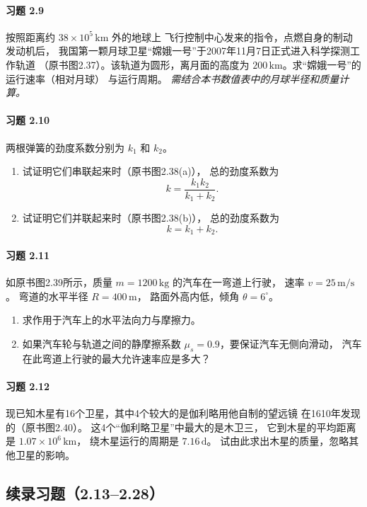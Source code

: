 \paragraph{习题 2.9}
按照距离约 \(38\times10^5\,\mathrm{km}\) 外的地球上
飞行控制中心发来的指令，点燃自身的制动发动机后，
我国第一颗月球卫星“嫦娥一号”于2007年11月7日正式进入科学探测工作轨道
（原书图2.37）。该轨道为圆形，离月面的高度为
\(200\,\mathrm{km}\)。求“嫦娥一号”的运行速率（相对月球）
与运行周期。
\textit{需结合本书数值表中的月球半径和质量计算。}

\paragraph{习题 2.10}
两根弹簧的劲度系数分别为 \(k_1\) 和 \(k_2\)。
\begin{enumerate}
\item 试证明它们串联起来时（原书图2.38(a)），
总的劲度系数为
\[
 k=\frac{k_1k_2}{k_1+k_2}.
\]
\item 试证明它们并联起来时（原书图2.38(b)），
总的劲度系数为
\[
 k=k_1+k_2.
\]
\end{enumerate}

\paragraph{习题 2.11}
如原书图2.39所示，质量
\(m=1200\,\mathrm{kg}\) 的汽车在一弯道上行驶，
速率 \(v=25\,\mathrm{m/s}\)。
弯道的水平半径 \(R=400\,\mathrm{m}\)，
路面外高内低，倾角 \(\theta=6^\circ\)。
\begin{enumerate}
\item 求作用于汽车上的水平法向力与摩擦力。
\item 如果汽车轮与轨道之间的静摩擦系数
\(\mu_s=0.9\)，要保证汽车无侧向滑动，
汽车在此弯道上行驶的最大允许速率应是多大？
\end{enumerate}

\paragraph{习题 2.12}
现已知木星有16个卫星，其中4个较大的是伽利略用他自制的望远镜
在1610年发现的（原书图2.40）。
这4个“伽利略卫星”中最大的是木卫三，
它到木星的平均距离是 \(1.07\times10^6\,\mathrm{km}\)，
绕木星运行的周期是 \(7.16\,\mathrm d\)。
试由此求出木星的质量，忽略其他卫星的影响。


\subsection*{续录习题（2.13--2.28）}

